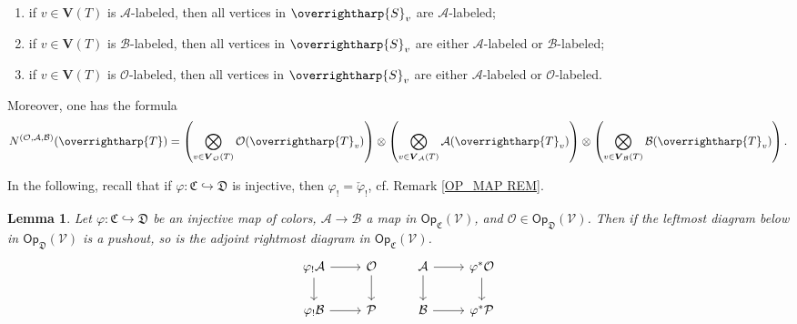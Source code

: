 \documentclass[a4paper,10pt
,draft
]{article}%
\numberwithin{equation}{section}
\numberwithin{figure}{section}
\newtheorem{lemma}[equation]{Lemma}%
\theoremstyle{definition} %
\newcommand{\vect}[1]{\text{\overrightharp{\ensuremath{#1}}}}
\newcommand{\V}{\ensuremath{\mathcal V}}
\newcommand{\1}{\ensuremath{\mathbbm 1}}%
\begin{document}
\begin{enumerate}[label=(\roman*)]
\item if $v \in \boldsymbol{V}(T)$ is $\mathcal{A}$-labeled,
 then all vertices in $\vect{S}_{v}$ are $\mathcal{A}$-labeled;
\item if $v \in \boldsymbol{V}(T)$ is $\mathcal{B}$-labeled,
 then all vertices in $\vect{S}_{v}$ are either $\mathcal{A}$-labeled or $\mathcal{B}$-labeled;
\item if $v \in \boldsymbol{V}(T)$ is $\mathcal{O}$-labeled, then all vertices in $\vect{S}_{v}$ are either $\mathcal{A}$-labeled or $\mathcal{O}$-labeled.
\end{enumerate}
Moreover, one has the formula
\begin{equation}\label{NBAO EQ}
N^{(\mathcal{O},\mathcal{A},\mathcal{B})}(\vect{T}) = 
\left(\bigotimes_{v \in \boldsymbol{V}_{\mathcal{O}}(T)} \mathcal{O}(\vect{T}_v) \right)
	\otimes
\left(\bigotimes_{v \in \boldsymbol{V}_{\mathcal{A}}(T)} \mathcal{A}(\vect{T}_v) \right)
	\otimes
\left(\bigotimes_{v \in \boldsymbol{V}_{\mathcal{B}}(T)} \mathcal{B}(\vect{T}_v) \right).
\end{equation}



In the following, recall that if 
$\varphi \colon \mathfrak{C} \hookrightarrow \mathfrak{D}$
is injective, then
$\varphi_! = \check{\varphi}_!$,
cf. Remark \ref{OP_MAP REM}.



\begin{lemma}\label{BASICPUSH LEMMA}
Let $\varphi \colon \mathfrak{C} \hookrightarrow \mathfrak{D}$ be an injective map of colors, 
$\mathcal{A} \to \mathcal{B}$ a map in 
$\mathsf{Op}_{\mathfrak{C}}(\V)$,
and
$\mathcal{O} \in \mathsf{Op}_{\mathfrak{D}}(\V)$.
%
Then if the leftmost diagram below in 
$\mathsf{Op}_{\mathfrak{D}}(\V)$ is a pushout,
so is the adjoint rightmost diagram in $\mathsf{Op}_{\mathfrak{C}}(\V)$.
\[
\begin{tikzcd}
	\varphi_! \mathcal{A} \ar{r} \ar{d} & \mathcal{O} \ar{d}
&
	\mathcal{A} \ar{r} \ar{d} & \varphi^{\**} \mathcal{O} \ar{d}
\\
	\varphi_! \mathcal{B} \ar{r} & \mathcal{P}
&
	\mathcal{B} \ar{r} & \varphi^{\**} \mathcal{P}
\end{tikzcd}
\]
\end{lemma}
\end{document}

